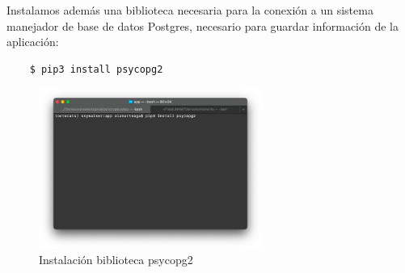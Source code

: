 \documentclass{article}
\begin{document}
\begin{enumerate}
    Instalamos además una biblioteca necesaria para la conexión a un
    sistema manejador de base de datos Postgres, necesario para guardar
    información de la aplicación:
    \begin{lstlisting}
    $ pip3 install psycopg2
    \end{lstlisting}
    \begin{figure}[H]
      \centering
      \includegraphics[width=0.65\textwidth]{AppServer/f6}
      \caption{Instalación biblioteca psycopg2}
    \end{figure}



\end{enumerate}
\end{document}
